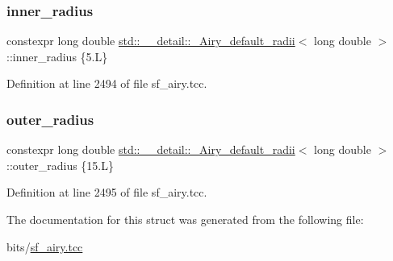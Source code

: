 \subsubsection{\texorpdfstring{inner\+\_\+radius}{inner\_radius}}
{\footnotesize\ttfamily constexpr long double \hyperlink{structstd_1_1____detail_1_1__Airy__default__radii}{std\+::\+\_\+\+\_\+detail\+::\+\_\+\+Airy\+\_\+default\+\_\+radii}$<$ long double $>$\+::inner\+\_\+radius \{5.\+L\}\hspace{0.3cm}{\ttfamily [static]}}



Definition at line 2494 of file sf\+\_\+airy.\+tcc.

\mbox{\label{structstd_1_1____detail_1_1__Airy__default__radii_3_01long_01double_01_4_ab46784c2c76dc0f43aeb85d22f8b21a7}} 
\subsubsection{\texorpdfstring{outer\+\_\+radius}{outer\_radius}}
{\footnotesize\ttfamily constexpr long double \hyperlink{structstd_1_1____detail_1_1__Airy__default__radii}{std\+::\+\_\+\+\_\+detail\+::\+\_\+\+Airy\+\_\+default\+\_\+radii}$<$ long double $>$\+::outer\+\_\+radius \{15.\+L\}\hspace{0.3cm}{\ttfamily [static]}}



Definition at line 2495 of file sf\+\_\+airy.\+tcc.



The documentation for this struct was generated from the following file\+:\begin{DoxyCompactItemize}
\item 
bits/\hyperlink{sf__airy_8tcc}{sf\+\_\+airy.\+tcc}\end{DoxyCompactItemize}
